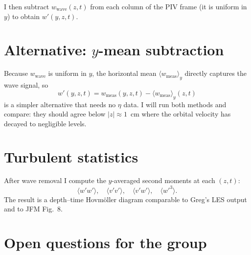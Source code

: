 \documentclass[11pt]{article}
\newcommand{\avg}[1]{\langle #1 \rangle}
\begin{document}
I then subtract $w_\text{wave}(z,t)$ from each column of the PIV frame
(it is uniform in $y$) to obtain $w'(y,z,t)$.

\section*{Alternative: $y$-mean subtraction}

Because $w_\text{wave}$ is uniform in $y$, the horizontal mean
$\avg{w_\text{meas}}_y$ directly captures the wave signal, so
\[
  w'(y,z,t) = w_\text{meas}(y,z,t) - \avg{w_\text{meas}}_y(z,t)
\]
is a simpler alternative that needs no $\eta$ data.
I will run both methods and compare: they should agree below
$|z| \approx 1$~cm where the orbital velocity has decayed to negligible levels.

\section*{Turbulent statistics}

After wave removal I compute the $y$-averaged second moments at each
$(z,t)$:
\[
  \avg{w'w'},\quad \avg{v'v'},\quad \avg{v'w'},\quad \avg{w'^3}.
\]
The result is a depth--time Hovm\"{o}ller diagram comparable to
Greg's LES output and to JFM Fig.~8.

\section*{Open questions for the group}
\end{document}
